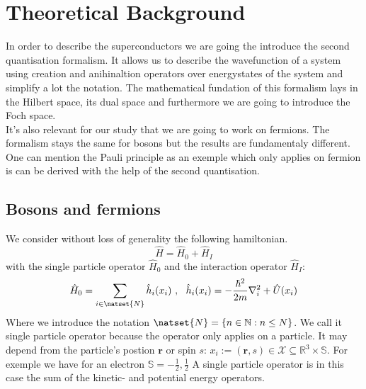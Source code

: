 \documentclass[../main.tex]{subfile}
\begin{document}
 \normalsize
\section{Theoretical Background}
In order to describe the superconductors we are going the introduce the second quantisation formalism.
It allows us to describe the wavefunction of a system using creation and anihinaltion operators over
energystates of the system and simplify a lot the notation. The mathematical fundation of this formalism
lays in the Hilbert space, its dual space and furthermore we are going to introduce the Foch space.\\

It's also relevant for our study that we are going to work on fermions. The formalism stays the same for 
bosons but the results are fundamentaly different. One can mention the Pauli principle as an exemple which
only applies on fermion is can be derived with the help of the second quantisation.\\ 

\subsection{Bosons and fermions}
We consider without loss of generality the following hamiltonian. 
\begin{equation}\label{eq:MasterHamiltonian}
    \hat{H} = \hat{H}_0 + \hat{H}_I
\end{equation}
with the single particle operator $\hat{H}_0$ and the interaction operator $\hat{H}_I$:
\[
    \hat{H}_0 = \sum_{i\in \natset{N}} \hat{h}_i(x_i)~,~~ \hat{h}_i(x_i) = -\frac{\hbar^2}{2m}\nabla_i^2 + \hat{U}(x_i)
\]
Where we introduce the notation $\natset{N} = \{n \in \mathbb{N}: n\leq N\}$. We call it single particle operator 
because the operator only applies on a particle. It may depend from the particle's postion $\bm{r}$ or spin $s$: 
$x_i := (\bm{r}, s) \in \mathcal{X}\subseteq\mathbb{R}^{3}\times\mathbb{S}$. For exemple we have for an electron 
$\mathbb{S}= {-\frac{1}{2},\frac{1}{2}}$ A single particle operator is in this case the sum of the kinetic- 
and potential energy operators.\\
\end{document}

